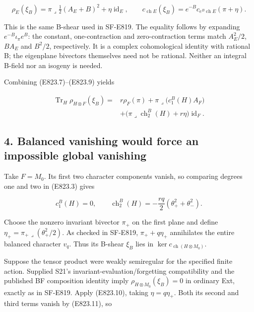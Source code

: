 \[
 \rho_E(\xi_B)=
       \pi\mathbin{\lrcorner}\tfrac12(A_E+B)^2
                         +\eta\operatorname{id}_E,
 \qquad
 c_{\operatorname{ch}E}(\xi_B)
    =e^{-B}c_{e^B\operatorname{ch}E}(\pi+\eta).
 \tag{E823.9}
\]

This is the same B-shear used in SF-E819. The equality follows by
expanding \(e^{-B}\iota_\pi e^B\): the constant, one-contraction and
zero-contraction terms match \(A_E^2/2\), \(BA_E\) and \(B^2/2\),
respectively. It is a complex cohomological identity with rational B;
the eigenplane bivectors themselves need not be rational. Neither an
integral B-field nor an isogeny is needed.

Combining (E823.7)--(E823.9) yields

\[
 \begin{split}
 \operatorname{Tr}_H\rho_{H\otimes F}(\xi_B)
   ={}&r\rho_F(\pi)
     +\pi\mathbin{\lrcorner}\bigl(c_1^B(H)A_F\bigr)\\
    &+\bigl(\pi\mathbin{\lrcorner}\operatorname{ch}_2^B(H)
                         +r\eta\bigr)\operatorname{id}_F.
 \end{split}
 \tag{E823.10}
\]

\subsection{4. Balanced vanishing would force an impossible global
vanishing}\label{SF-E823-balanced-vanishing-would-force-an-impossible-global-vanishing}

Take \(F=M_0\). Its first two character components vanish, so comparing
degrees one and two in (E823.3) gives

\[
 c_1^B(H)=0,
 \qquad \operatorname{ch}_2^B(H)
       =-\frac{rq}{2}(\theta_+^2+\theta_-^2).
 \tag{E823.11}
\]

Choose the nonzero invariant bivector \(\pi_+\) on the first plane and
define \(\eta_+=\pi_+\mathbin{\lrcorner}(\theta_+^2/2)\). As checked in
SF-E819, \(\pi_++q\eta_+\) annihilates the entire balanced character
\(v_q\). Thus its B-shear \(\xi_B\) lies in
\(\ker c_{\operatorname{ch}(H\otimes M_0)}\).

Suppose the tensor product were weakly semiregular for the specified
finite action. Supplied S21's invariant-evaluation/forgetting
compatibility and the published BF composition identity imply
\(\rho_{H\otimes M_0}(\xi_B)=0\) in ordinary Ext, exactly as in SF-E819.
Apply (E823.10), taking \(\eta=q\eta_+\). Both its second and third
terms vanish by (E823.11), so


